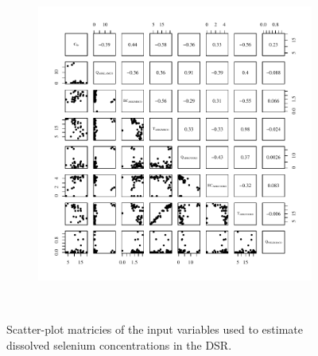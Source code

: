 \begin{linenumbers}
\begin{landscape}
\begin{figure}
\begin{subfigure}{0.7\textwidth}
		\end{subfigure}%
		\begin{subfigure}{0.7\textwidth}
			\centering			
			\includegraphics[width=\tableCustomSize]{"Figures/Results_DSR/Stochastic/Conc Model Full PairsWIL"}
		\end{subfigure}\\
		\caption{Scatter-plot matricies of the input variables used to estimate dissolved selenium concentrations in the DSR.}
	\end{figure}
\end{landscape}
\subfiguremid
\begin{landscape}
	\begin{figure}
		\begin{subfigure}{0.7\textwidth}
			\centering

\end{subfigure}
\end{figure}
\end{landscape}
\end{linenumbers}
